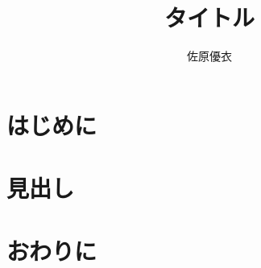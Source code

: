 \documentclass[twocolumn]{jsarticle}
\begin{document}
\title{タイトル}
\author{佐原優衣}
\maketitle

\section{はじめに}
\section{見出し}
\section{おわりに}
\end{document}
